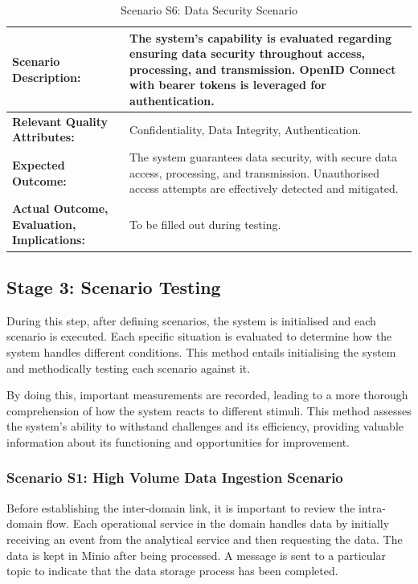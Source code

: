 \documentclass[preprint,12pt]{elsarticle}
\begin{document}
\begin{table}[tbp]
  \caption{Scenario S6: Data Security Scenario}
  \begin{tabularx}{\textwidth}{|>{\raggedright\arraybackslash}p{5cm}|X|}
  \hline
  \textbf{Scenario Description:} & The system's capability is evaluated regarding ensuring data security throughout access, processing, and transmission. OpenID Connect with bearer tokens is leveraged for authentication. \\
  \hline
  \textbf{Relevant Quality Attributes:} & Confidentiality, Data Integrity, Authentication. \\
  \hline
  \textbf{Expected Outcome:} & The system guarantees data security, with secure data access, processing, and transmission. Unauthorised access attempts are effectively detected and mitigated. \\
  \hline
  \textbf{Actual Outcome, Evaluation, Implications:} & To be filled out during testing. \\
  \hline
  \end{tabularx}
  \label{s6Table}
\end{table}


\subsection{Stage 3: Scenario Testing}

During this step, after defining scenarios, the system is initialised and each scenario is executed. Each specific situation is evaluated to determine how the system handles different conditions. This method entails initialising the system and methodically testing each scenario against it. 

By doing this, important measurements are recorded, leading to a more thorough comprehension of how the system reacts to different stimuli. This method assesses the system's ability to withstand challenges and its efficiency, providing valuable information about its functioning and opportunities for improvement.

\subsubsection{Scenario S1: High Volume Data Ingestion Scenario}

Before establishing the inter-domain link, it is important to review the intra-domain flow. Each operational service in the domain handles data by initially receiving an event from the analytical service and then requesting the data. The data is kept in Minio after being processed. A message is sent to a particular topic to indicate that the data storage process has been completed. 
\end{document}
